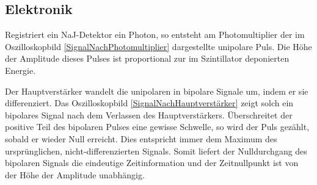 \subsection{Elektronik}

Registriert ein NaJ-Detektor ein Photon, so entsteht am Photomultiplier der im Oszilloskopbild \ref{SignalNachPhotomultiplier} dargestellte unipolare Puls.
Die Höhe der Amplitude dieses Pulses ist proportional zur im Szintillator deponierten Energie.

Der Hauptverstärker wandelt die unipolaren in bipolare Signale um, indem er sie differenziert.
Das Oszilloskopbild \ref{SignalNachHauptverstärker} zeigt solch ein bipolares Signal nach dem Verlassen des Hauptverstärkers.
Überschreitet der positive Teil des bipolaren Pulses eine gewisse Schwelle, so wird der Puls gezählt, sobald er wieder Null erreicht.
Dies entspricht immer dem Maximum des ursprünglichen, nicht-differenzierten Signals.
Somit liefert der Nulldurchgang des bipolaren Signals die eindeutige Zeitinformation und der Zeitnullpunkt ist von der Höhe der Amplitude unabhängig.

